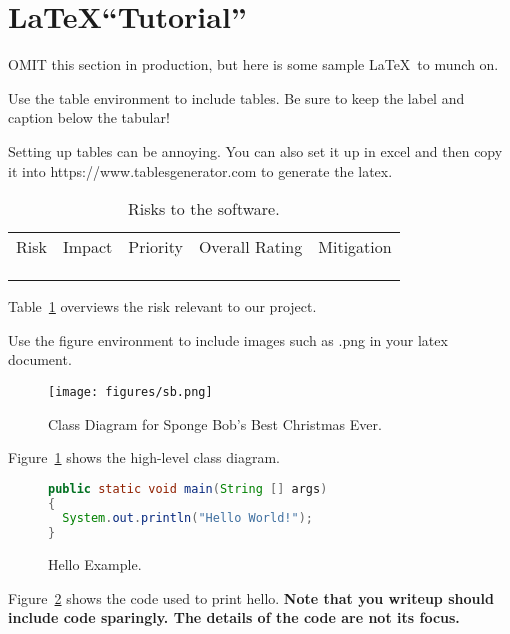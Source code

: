
\section{\LaTeX ``Tutorial''}

OMIT this section in production, but here is some sample \LaTeX~to munch on.

Use the table environment to include tables.
Be sure to keep the label and caption below the tabular!

Setting up tables can be annoying. You can also set it up in excel and then
copy it into \textsf{https://www.tablesgenerator.com} to generate the latex. 



\begin{table}[h!]
    \centering
    \begin{tabular}{|c|c|c|c|c|}
    \hline
      Risk   & Impact & Priority  & Overall Rating  & Mitigation \\
         &  &  &  & \\\hline
         &  &  &  & \\\hline
         &  &  &  & \\\hline
    \end{tabular}
    \caption{Risks to the software.}
    \label{tab:risks}
\end{table}

Table~\ref{tab:risks} overviews the risk relevant to our project.


Use the figure environment to include images such as \textsf{.png} in your latex document. \\

\begin{figure}[!bh]
\centering
\texttt{[image: figures/sb.png]} \\
\caption{Class Diagram for Sponge Bob's Best Christmas Ever.}
\label{fig:class}
\end{figure}

Figure~\ref{fig:class} shows the high-level class diagram.


\begin{figure}[!bht]
\begin{lstlisting}[language=Java]
public static void main(String [] args)
{
  System.out.println("Hello World!");
}
\end{lstlisting}
\caption{Hello Example.}
\label{fig:hello}
\end{figure}

Figure~\ref{fig:hello} shows the code used to print hello.
\textbf{Note that you writeup should include code sparingly.
The details of the code are not its focus.}

